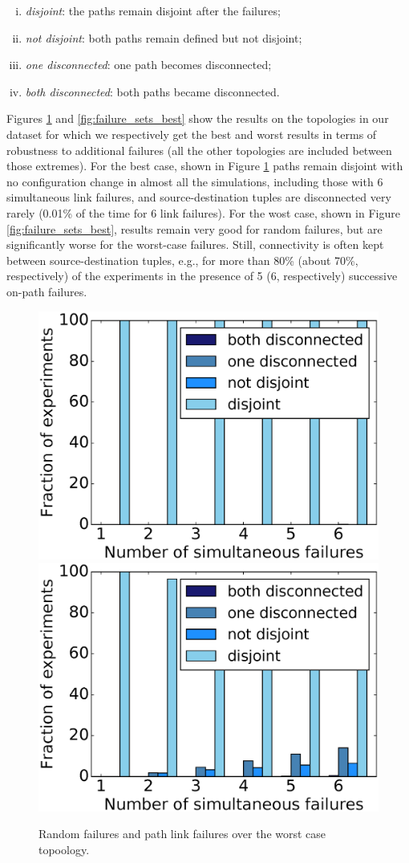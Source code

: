 \begin{enumerate}[i)]
 \item \emph{disjoint}: the paths remain disjoint after the failures;
 \item \emph{not disjoint}: both paths remain defined but not disjoint;
 \item \emph{one disconnected}: one path becomes disconnected;
 \item \emph{both disconnected}: both paths became disconnected.
\end{enumerate}

Figures \ref{fig:failure_sets_worst} and \ref{fig:failure_sets_best}
show the results on the topologies in our dataset for which we respectively get
the best and worst results in terms of robustness to additional failures (all
the other topologies are included between those extremes).
For the best case, shown in Figure \ref{fig:failure_sets_worst} paths remain disjoint with no configuration change in almost all the
simulations, including those with 6 simultaneous link failures, and
source-destination tuples are disconnected very rarely (0.01\% of the time for 6
link failures).
For the wost case, shown in Figure \ref{fig:failure_sets_best}, results remain very good for random failures, but are significantly
worse for the worst-case failures. Still, connectivity is often kept between
source-destination tuples, e.g., for more than 80\% (about 70\%, respectively)
of the experiments in the presence of 5 (6, respectively) successive on-path
failures.

\begin{figure}
\begin{center}
\includegraphics[width=0.45 \columnwidth]{figures/real1_random.eps}
\includegraphics[width=0.45 \columnwidth]{figures/real1_worst.eps}
\end{center}
\caption{Random failures and path link failures over the worst case topoology.}
\label{fig:failure_sets_worst}
\end{figure}

